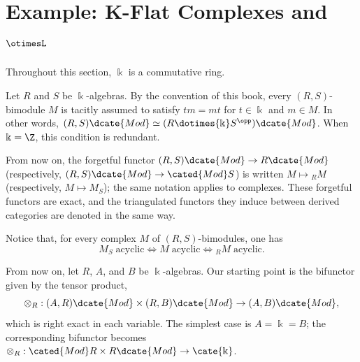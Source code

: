 
\section{Example: K-Flat Complexes and \texorpdfstring{$\otimesL$}{otimesL}}\label{sec:otimesL}
\hypertarget{o014.aljabr2.chapter4.k-flat-derived-tensor-a}{ }

Throughout this section, $\Bbbk$ is a commutative ring.

\begin{convention}\label{con:bimodule-algebra}
	Let $R$ and $S$ be $\Bbbk$-algebras. By the convention of this book, every
	$(R,S)$-bimodule $M$ is tacitly assumed to satisfy $tm=mt$ for
	$t\in\Bbbk$ and $m\in M$. In other words,
	$(R,S)\dcate{Mod}\simeq(R\dotimes{\Bbbk}S^{\opp})\dcate{Mod}$. When
	$\Bbbk=\Z$, this condition is redundant.

	From now on, the forgetful functor
	$(R,S)\dcate{Mod}\to R\dcate{Mod}$ (respectively,
	$(R,S)\dcate{Mod}\to\cated{Mod}S$) is written
	$M\mapsto{}_RM$ (respectively, $M\mapsto M_S$); the same notation applies
	to complexes. These forgetful functors are exact, and the triangulated
	functors they induce between derived categories are denoted in the same way.
\end{convention}

Notice that, for every complex $M$ of $(R,S)$-bimodules, one has
\[ M_S \;\text{acyclic} \iff M \;\text{acyclic} \iff {}_R M \;\text{acyclic}. \]

From now on, let $R$, $A$, and $B$ be $\Bbbk$-algebras. Our starting point is
the bifunctor given by the tensor product,
\[ \otimes_R: (A, R)\dcate{Mod} \times (R, B)\dcate{Mod} \to (A, B)\dcate{Mod}, \]
which is right exact in each variable. The simplest case is $A=\Bbbk=B$; the
corresponding bifunctor becomes
$\otimes_R:\cated{Mod}R\times R\dcate{Mod}\to\cate{\Bbbk}$.

